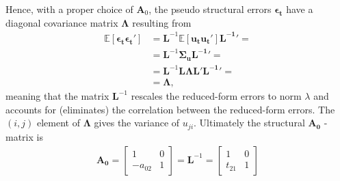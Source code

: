 \documentclass[a4paper,11pt,listof=nochaptergap,oneside,pointednumbers,bibtotoc,bigheadings,liststotoc,hidelinks]{scrbook}
\theoremstyle{mysatz}
\theoremstyle{mydefinition}
\theoremstyle{mytheorem}
\theoremstyle{mybemerkung}
\newcommand{\vect}[1]{\boldsymbol{\mathbf{#1}}}
\begin{document}
Hence, with a proper choice of $\vect{A}_0$, the pseudo structural errors $\vect{\epsilon_t}$ have a diagonal covariance matrix $\vect{\Lambda}$ resulting from 
\begin{equation} \label{eq:svar22}
\begin{split}
	\mathbb{E}[\vect{\epsilon_t}\vect{\epsilon_t}'] & = \vect{L}^{-1} \mathbb{E}[\vect{u_t}\vect{u_t}']\vect{L^{-1}}' = \\
										& = \vect{L}^{-1} \vect{\Sigma_u} \vect{L^{-1}}' = \\
										& = \vect{L}^{-1} \vect{L \Lambda L}' \vect{L^{-1}}' = \\
										& = \vect{\Lambda},
\end{split}								
\end{equation}
meaning that the matrix $\vect{L}^{-1}$ rescales the reduced-form errors to norm $\lambda$ and accounts for (eliminates) the correlation between the reduced-form errors. The $(i, j)$ element of $\vect{\Lambda}$ gives the variance of $u_{ji}$. Ultimately the structural $\vect{A_0}$ - matrix is
\begin{equation} \label{eq:svar23}
\begin{split}
	\vect{A_0} = \begin{bmatrix}
    					1 & 0 \\
					-a_{02} & 1
 					\end{bmatrix} = 
					\vect{L}^{-1} = 
						\begin{bmatrix}
    						1 & 0 \\
						t_{21} & 1
 						\end{bmatrix}
\end{split}								
\end{equation}
\end{document}

